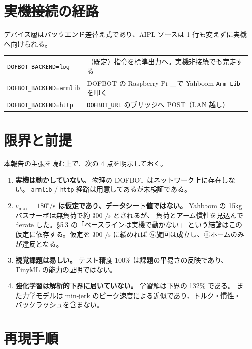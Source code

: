 \documentclass[11pt,a4paper]{article}
\begin{document}
\section{実機接続の経路}
\label{sec:real}

デバイス層はバックエンド差替え式であり、AIPL ソースは 1 行も変えずに実機へ向けられる。

\begin{center}
\small
\begin{tabular}{@{}ll@{}}
\toprule
\texttt{DOFBOT\_BACKEND=log} & （既定）指令を標準出力へ。実機非接続でも完走する \\
\texttt{DOFBOT\_BACKEND=armlib} & DOFBOT の Raspberry Pi 上で Yahboom \texttt{Arm\_Lib} を叩く \\
\texttt{DOFBOT\_BACKEND=http} & \texttt{DOFBOT\_URL} のブリッジへ POST（LAN 越し） \\
\bottomrule
\end{tabular}
\end{center}

\section{限界と前提}

本報告の主張を読む上で、次の 4 点を明示しておく。

\begin{enumerate}[leftmargin=1.6em,itemsep=2pt]
  \item \textbf{実機は動かしていない。} 物理の DOFBOT はネットワーク上に存在しない。
        \texttt{armlib} / \texttt{http} 経路は用意してあるが未検証である。
  \item \textbf{$v_{\max} = 180^\circ/\mathrm{s}$ は仮定であり、データシート値ではない。}
        Yahboom の 15kg バスサーボは無負荷で約 $300^\circ/\mathrm{s}$ とされるが、
        負荷とアーム慣性を見込んで derate した。\S5.3 の「ベースラインは実機で動かない」
        という結論はこの仮定に依存する。仮定を $300^\circ/\mathrm{s}$ に緩めれば
        ⑥旋回は成立し、⑪ホームのみが違反となる。
  \item \textbf{視覚課題は易しい。} テスト精度 100\% は課題の平易さの反映であり、
        TinyML の能力の証明ではない。
  \item \textbf{強化学習は解析的下界に届いていない。} 学習解は下界の 132\% である。
        また力学モデルは min-jerk のピーク速度による近似であり、トルク・慣性・
        バックラッシュを含まない。
\end{enumerate}

\section{再現手順}
\end{document}
